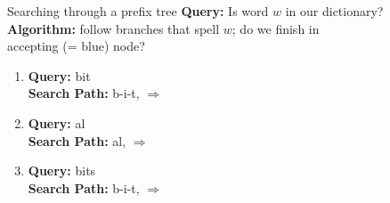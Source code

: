 \documentclass[professionalfonts, xcolor={usenames,svgnames,x11names,table}]{beamer}
\begin{document}
\begin{frame}{Searching through a prefix tree}
    \textbf{Query:} Is word $w$ in our dictionary?\\
    \textbf{Algorithm:} follow branches that spell $w$; do we finish in \\
    accepting (= blue) node?
    \begin{example}
        \begin{enumerate}
            \item \textbf{Query:} bit\\
                  \textbf{Search Path:} b-i-t,  $\Rightarrow$ 
            \item \textbf{Query:} al\\
                  \textbf{Search Path:} al,  $\Rightarrow$ 
            \item \textbf{Query:} bits\\
                  \textbf{Search Path:} b-i-t,  $\Rightarrow$ 
        \end{enumerate}
    \end{example}
\end{frame}
\end{document}
